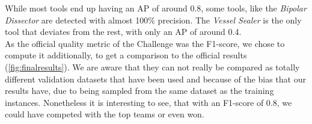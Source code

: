 \begin{figure}[h]
\end{figure}

While most tools end up having an AP of around 0.8, some tools, like the \emph{Bipolar Dissector} are detected with almost 100\% precision. The \emph{Vessel Sealer} is the only tool that deviates from the rest, with only an AP of around 0.4.\\
As the official quality metric of the Challenge was the F1-score, we chose to compute it additionally, to get a comparison to the official results (\ref{fig:finalresults}). We are aware that they can not really be compared as totally different validation datasets that have been used and because of the bias that our results have, due to being sampled from the same dataset as the training instances. Nonetheless it is interesting to see, that with an F1-score of 0.8, we could have competed with the top teams or even won.